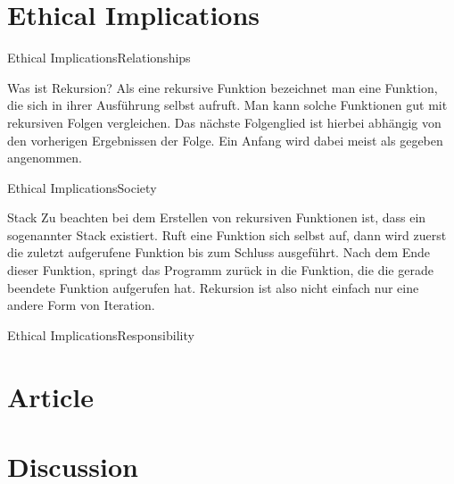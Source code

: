 \documentclass[usenames,dvipsnames,10pt]{beamer}
\begin{document}
    \section{Ethical Implications}
    \begin{frame}{Ethical Implications}{Relationships}
        \begin{block}{Was ist Rekursion?}
            Als eine rekursive Funktion bezeichnet man eine Funktion, die sich in ihrer Ausführung selbst aufruft.
            Man kann solche Funktionen gut mit rekursiven Folgen vergleichen. Das nächste Folgenglied ist hierbei abhängig von 
            den vorherigen Ergebnissen der Folge. Ein Anfang wird dabei meist als gegeben angenommen.
        \end{block}
    \end{frame}
    \begin{frame}{Ethical Implications}{Society}
        \begin{block}{Stack}
            Zu beachten bei dem Erstellen von rekursiven Funktionen ist, dass ein sogenannter Stack existiert. Ruft eine Funktion sich selbst auf,
            dann wird zuerst die zuletzt aufgerufene Funktion bis zum Schluss ausgeführt. Nach dem Ende dieser Funktion, springt das Programm zurück 
            in die Funktion, die die gerade beendete Funktion aufgerufen hat. Rekursion ist also nicht einfach nur eine andere Form von Iteration.
        \end{block}
    \end{frame}
    \begin{frame}{Ethical Implications}{Responsibility}
        
    \end{frame}


    \section{Article}



    \section{Discussion}
\end{document}
